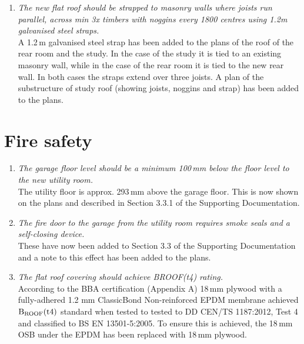 \documentclass{extension}
\begin{document}
\begin{enumerate}
\item {\it The new flat roof should be strapped to masonry walls where joists run parallel, across min 3x timbers with noggins every 1800 centres using 1.2m galvanised steel straps.}\\
A 1.2\,m galvanised steel strap has been added to the plans of the roof of the rear room and the study. In the case of the study it is tied to an existing masonry wall, while in the case of the rear room it is tied to the new rear wall. In both cases the straps extend over three joists. A plan of the substructure of study roof (showing joists, noggins and strap) has been added to the plans.
\end{enumerate}

\section{Fire safety}
\begin{enumerate}
\item {\it The garage floor level should be a minimum 100\,mm below the floor level to the new utility room.}\\
The utility floor is approx. 293\,mm above the garage floor. This is now shown on the plans and described in Section 3.3.1 of the Supporting Documentation.
\item {\it The fire door to the garage from the utility room requires smoke seals and a self-closing device.}\\
These have now been added to Section 3.3 of the Supporting Documentation and a note to this effect has been added to the plans.
\item {\it The flat roof covering should achieve BROOF(t4) rating.}\\According to the BBA certification (Appendix A) 18\,mm plywood with a fully-adhered 1.2 mm ClassicBond Non-reinforced EPDM membrane achieved ${\rm B_{ROOF}(t4)}$ standard when tested to tested to DD CEN/TS 1187:2012, Test 4 and classified to BS EN 13501-5:2005. To ensure this is achieved, the 18\,mm OSB under the EPDM has been replaced with 18\,mm plywood.
\end{enumerate}
\end{document}
